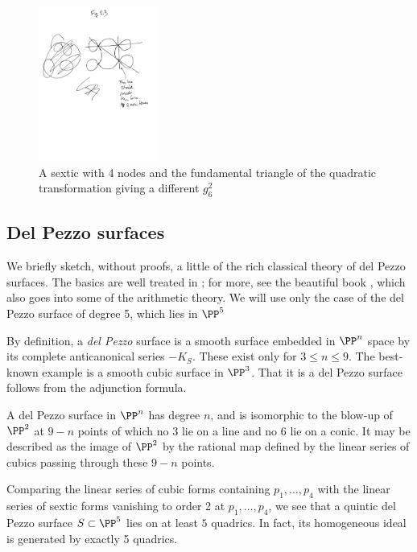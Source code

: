  
\begin{figure}
\begin{center}
\centerline {\includegraphics[height=2in]{"Fig11.3.pdf"}}
\caption{A sextic with 4 nodes and the fundamental triangle of the quadratic transformation giving
a different $g^{2}_{6}$}
\label{default}
\end{center}
\end{figure}


\subsection{Del Pezzo surfaces}

We briefly sketch, without proofs, a little of the 
 rich classical theory of del Pezzo surfaces. The basics are well treated in \cite[pp. 45--50]{Beauville}; for more, see the
beautiful book \cite{Manin}, which also goes into some of the arithmetic theory. We will use only the case of the del Pezzo surface of degree 5, which lies in $\PP^{5}$

By definition,
a \emph{del Pezzo} surface is a smooth surface embedded in $\PP^n$ space by its complete anticanonical series $-K_S$. These exist only for $3\leq n\leq 9$. The best-known example is a smooth cubic surface in $\PP^3$. That it is a del Pezzo surface follows from the adjunction formula.

A del Pezzo surface in $\PP^n$ has degree $n$, and is isomorphic to the blow-up of $\PP^2$ at $9-n$ points of which no 3 lie on a line and no 6 lie on a conic. It may be described as the image of $\PP^2$ by the rational map defined by the linear series of cubics passing through these $9-n$ points. 



Comparing the linear series  of cubic forms containing $p_1,\dots,p_4$ with the linear series  of sextic forms vanishing to order 2 at $p_1,\dots,p_4$, we see that a quintic del Pezzo surface $S \subset \PP^5$ lies on at least $5$ quadrics. In fact, its homogeneous ideal is generated by exactly 5 quadrics.


